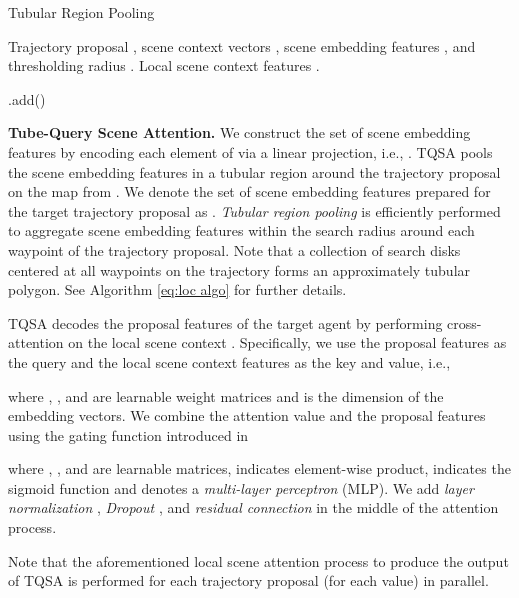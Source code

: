 \documentclass[10pt,twocolumn,letterpaper]{article}
\begin{document}
\begin{algorithm}[t]
\caption{Tubular Region Pooling} \label{eq:loc algo}
\begin{algorithmic}[1]
\renewcommand{\algorithmicrequire}{\textbf{Input:}}
\renewcommand{\algorithmicensure}{\textbf{Output:}}
\REQUIRE Trajectory proposal , scene context vectors , scene embedding features , and thresholding radius .
\ENSURE  Local scene context features .
\\
\STATE 
{}
\STATE 
\IF {}
\item .add()
\ENDIF
\ENDFOR
\ENDFOR
\STATE
\RETURN 
\end{algorithmic}
\end{algorithm}

\noindent\textbf{Tube-Query Scene Attention.} We construct the set of scene embedding features  by encoding each element of  via a linear projection, i.e., . 
TQSA pools the scene embedding features in a tubular region around the trajectory proposal on the map from . We denote the set of  scene embedding features prepared for the target trajectory proposal  as  .  {\it Tubular region pooling} is efficiently performed to aggregate  scene embedding features   within the search radius  around each waypoint of the trajectory proposal. Note that a collection of search disks centered at all waypoints on the trajectory forms an approximately tubular polygon. See Algorithm \ref{eq:loc algo} for further details.  




TQSA decodes the proposal features  of the target agent by performing cross-attention on the local scene context . Specifically, we use the proposal features  as the query and the local scene context features  as the key  and value, i.e., 

where , , and  are learnable weight matrices and  is the dimension of the embedding vectors. We combine the attention value  and the  proposal features  using the gating function introduced in \cite{HiVT}

where , , and  are learnable matrices,  indicates element-wise product,  indicates the sigmoid function and  denotes a {\it multi-layer perceptron} (MLP). We add {\it layer normalization} \cite{LayerNormalization}, {\it Dropout} \cite{Dropout}, and {\it residual connection} \cite{ResNet} in the middle of the attention process.  

Note that the aforementioned local scene attention process to produce the output of TQSA  is performed for each trajectory proposal (for each  value)  in parallel.
\end{document}
